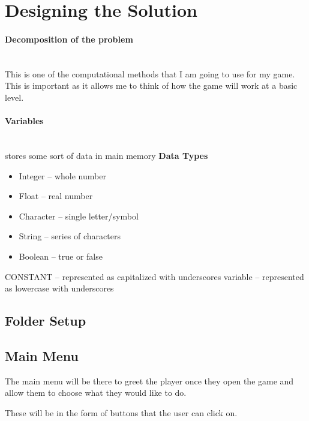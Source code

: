 \documentclass{article}
\newcommand{\parBr}{\vspace{5mm}}%
\newcommand{\myparagraph}[1]{\paragraph{#1}\mbox{}\\} %
\begin{document}
\section{Designing the Solution}
\myparagraph{Decomposition of the problem}   
This is one of the computational methods that I am going to use for my game. This is important as it allows me to think of how the game will work at a basic level. 

\parBr

\myparagraph{Variables}
stores some sort of data in main memory \linebreak \textbf{Data Types}
\begin{itemize}
\item Integer – whole number   
\item Float – real number   
\item Character – single letter/symbol   
\item String – series of characters   
\item Boolean – true or false   
\end{itemize}

CONSTANT – represented as capitalized with underscores
\linebreak
variable – represented as lowercase with underscores 

\subsection{Folder Setup}

\subsection{Main Menu}
The main menu will be there to greet the player once they open the game and allow them to choose what they would like to do.

\parBr

These will be in the form of buttons that the user can click on.

\parBr

\begin{center}
\end{center}
\end{document}
